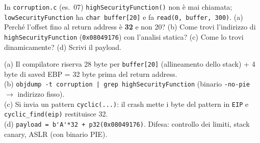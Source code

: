 \question[7]
In \lstinline|corruption.c| (es.\ 07) \lstinline|highSecurityFunction()| non è mai chiamata; \lstinline|lowSecurityFunction| ha \lstinline|char buffer[20]| e fa \lstinline|read(0, buffer, 300)|.
(a) Perché l'offset fino al return address è \textbf{32} e non 20? (b) Come trovi l'indirizzo di \lstinline|highSecurityFunction| (\lstinline|0x08049176|) con l'analisi statica? (c) Come lo trovi dinamicamente? (d) Scrivi il payload.
\begin{solution}
(a) Il compilatore riserva 28 byte per \lstinline|buffer[20]| (allineamento dello stack) + 4 byte di saved EBP = 32 byte prima del return address.\\
(b) \lstinline!objdump -t corruption | grep highSecurityFunction! (binario \lstinline|-no-pie| $\to$ indirizzo fisso).\\
(c) Si invia un pattern \lstinline|cyclic(...)|: il crash mette i byte del pattern in \lstinline|EIP| e \lstinline|cyclic_find(eip)| restituisce 32.\\
(d) \lstinline|payload = b'A'*32 + p32(0x08049176)|. Difesa: controllo dei limiti, stack canary, ASLR (con binario PIE).
\end{solution}
